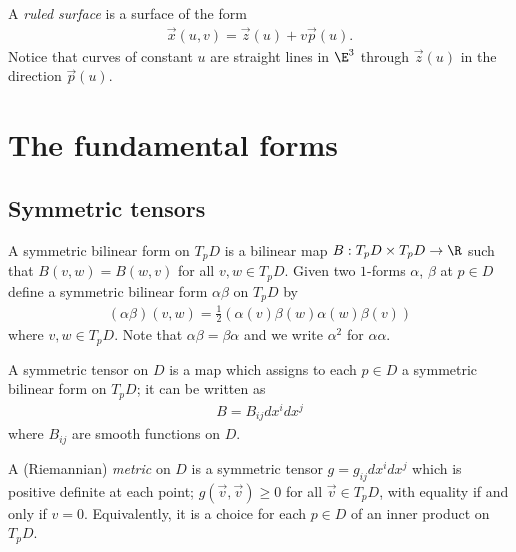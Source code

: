 \documentclass{article}
\begin{document}
\begin{definition}
    A \emph{ruled surface} is a surface of the form 
    \begin{align*}
        \vec x(u,v)= \vec z(u) + v\vec p(u).
    \end{align*}
    Notice that curves of constant $u$ are straight lines in $\E^3$ through 
    $\vec z(u)$ in the direction $\vec p(u)$.
\end{definition}

\section{The fundamental forms}

\subsection{Symmetric tensors}

\begin{definition}
    A symmetric bilinear form on $T_pD$ is a bilinear map $B:T_pD\times T_pD 
    \to\R$ such that $B(v,w)=B(w,v)$ for all $v,w\in T_pD$. Given two $1$-forms
    $\alpha$, $\beta$ at $p\in D$ define a symmetric bilinear form $\alpha\beta$
    on $T_pD$ by 
    \begin{align*}
        (\alpha\beta)(v, w) = \frac{1}{2}(\alpha(v)\beta(w) \alpha(w)\beta(v)) 
    \end{align*}
    where $v,w\in T_pD$. Note that $\alpha\beta=\beta\alpha$ and we write $\alpha^2$
    for $\alpha\alpha$.
\end{definition}

\begin{definition}
    A symmetric tensor on $D$ is a map which assigns to each $p\in D$ a symmetric
    bilinear form on $T_pD$; it can be written as
    \begin{align*}
        B=B_{ij}dx^idx^j
    \end{align*}
    where $B_{ij}$ are smooth functions on $D$.
\end{definition}

\begin{definition}
    A (Riemannian) \emph{metric} on $D$ is a symmetric tensor $g=g_{ij}dx^idx^j$ 
    which is positive definite at each point; $g(\vec v,\vec v)\geq 0$ for all
    $\vec v \in T_pD$, with equality if and only if $v=0$. Equivalently, it is a 
    choice for each $p\in D$ of an inner product on $T_pD$.
\end{definition}
\end{document}

